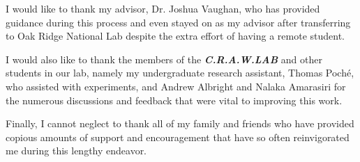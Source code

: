 
\begin{acknowledgements}

I would like to thank my advisor, Dr. Joshua Vaughan, who has provided guidance during this process and even stayed on as my advisor after transferring to Oak Ridge National Lab despite the extra effort of having a remote student.

I would also like to thank the members of the \textsl{\textbf{\textsf{C.R.A.W.LAB}}} and other students in our lab, namely my undergraduate research assistant, Thomas Poch\'{e}, who assisted with experiments, and Andrew Albright and Nalaka Amarasiri for the numerous discussions and feedback that were vital to improving this work.

Finally, I cannot neglect to thank all of my family and friends who have provided copious amounts of support and encouragement that have so often reinvigorated me during this lengthy endeavor.

\end{acknowledgements}